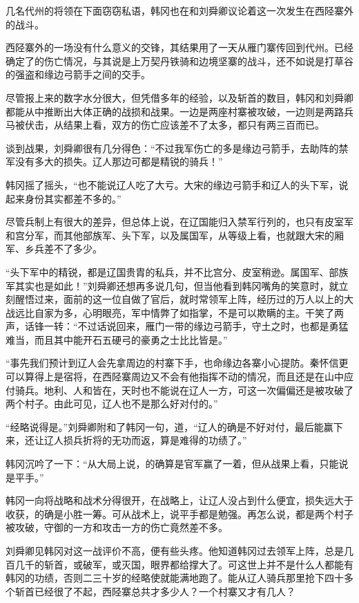 几名代州的将领在下面窃窃私语，韩冈也在和刘舜卿议论着这一次发生在西陉寨外的战斗。

西陉寨外的一场没有什么意义的交锋，其结果用了一天从雁门寨传回到代州。已经确定了的伤亡情况，与其说是上万契丹铁骑和边境坚寨的战斗，还不如说是打草谷的强盗和缘边弓箭手之间的交手。

尽管报上来的数字水分很大，但凭借多年的经验，以及斩首的数目，韩冈和刘舜卿都能从中推断出大体正确的战损和战果。一边是两座村寨被攻破，一边则是两路兵马被伏击，从结果上看，双方的伤亡应该差不了太多，都只有两三百而已。

谈到战果，刘舜卿很有几分得色：“不过我军伤亡的多是缘边弓箭手，去助阵的禁军没有多大的损失。辽人那边可都是精锐的骑兵！”

韩冈摇了摇头，“也不能说辽人吃了大亏。大宋的缘边弓箭手和辽人的头下军，说起来身份其实都差不多的。”

尽管兵制上有很大的差异，但总体上说，在辽国能归入禁军行列的，也只有皮室军和宫分军，而其他部族军、头下军，以及属国军，从等级上看，也就跟大宋的厢军、乡兵差不了多少。

“头下军中的精锐，都是辽国贵胄的私兵，并不比宫分、皮室稍逊。属国军、部族军其实也是如此！”刘舜卿还想再多说几句，但当他看到韩冈嘴角的笑意时，就立刻醒悟过来，面前的这一位自做了官后，就时常领军上阵，经历过的万人以上的大战远比自家为多，心明眼亮，军中情弊了如指掌，不是可以欺瞒的主。干笑了两声，话锋一转：“不过话说回来，雁门一带的缘边弓箭手，守土之时，也都是勇猛难当，而且其中能开石五硬弓的豪勇之士比比皆是。”

“事先我们预计到辽人会先拿周边的村寨下手，也命缘边各寨小心提防。秦怀信更可以算得上是宿将，在西陉寨周边又不会有他指挥不动的情况，而且还是在山中应付骑兵。地利、人和皆在，天时也不能说在辽人一方，可这一次偏偏还是被攻破了两个村子。由此可见，辽人也不是那么好对付的。”

“经略说得是。”刘舜卿附和了韩冈一句，道，“辽人的确是不好对付，最后能赢下来，还让辽人损兵折将的无功而返，算是难得的功绩了。”

韩冈沉吟了一下：“从大局上说，的确算是官军赢了一着，但从战果上看，只能说是平手。”

韩冈一向将战略和战术分得很开，在战略上，让辽人没占到什么便宜，损失远大于收获，的确是小胜一筹。可从战术上，说平手都是勉强。再怎么说，都是两个村子被攻破，守御的一方和攻击一方的伤亡竟然差不多。

刘舜卿见韩冈对这一战评价不高，便有些头疼。他知道韩冈过去领军上阵，总是几百几千的斩首，或破军，或灭国，眼界都给撑大了。可这世上并不是什么人都能有韩冈的功绩，否则二三十岁的经略使就能满地跑了。能从辽人骑兵那里抢下四十多个斩首已经很了不起，西陉寨总共才多少人？一个村寨又才有几人？

